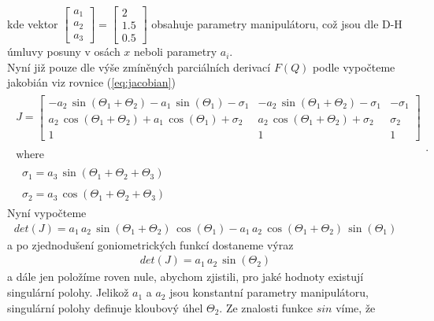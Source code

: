 \documentclass{article}
\begin{document}
			kde vektor \(\begin{bmatrix}a_{1}\\ a_{2}\\ a_{3}\end{bmatrix} = \begin{bmatrix}2\\ 1.5\\ 0.5\end{bmatrix}\) obsahuje parametry manipulátoru, což jsou dle D-H úmluvy posuny v osách \(x\) neboli parametry \(a_{i}\).\\
			Nyní již pouze dle výše zmíněných parciálních derivací \(F(Q)\) podle vypočteme jakobián viz rovnice (\eqref{eq:jacobian}) 
				\begin{align}
					\begin{array}{c}J=
					\begin{bmatrix}
						-a_2 \,\sin \left(\Theta_1 +\Theta_2 \right)-a_1 \,\sin \left(\Theta_1 \right)-\sigma_1  &-a_2 \,\sin \left(\Theta_1 +\Theta_2 \right)-\sigma_1  & -\sigma_1 \\
						a_2 \,\cos \left(\Theta_1 +\Theta_2 \right)+a_1 \,\cos \left(\Theta_1 \right)+\sigma_2  & a_2\,\cos \left(\Theta_1 +\Theta_2 \right)+\sigma_2  & \sigma_2 \\
						1 & 1 & 1
					\end{bmatrix}\\
					\mathrm{}\\
					\mathrm{where}\\
					\mathrm{}\\
					\;\;\sigma_1 =a_3 \,\sin \left(\Theta_1 +\Theta_2 +\Theta_3 \right)\\
					\mathrm{}\\
					\;\;\sigma_2 =a_3 \,\cos \left(\Theta_1 +\Theta_2 +\Theta_3 \right)
					\end{array}.
				\end{align}
			Nyní vypočteme 
				\begin{align}
					det(J)=a_1 \,a_2 \,\sin \left(\Theta_1 +\Theta_2 \right)\,\cos \left(\Theta_1 \right)-a_1 \,a_2\,\cos \left(\Theta_1 +\Theta_2 \right)\,\sin \left(\Theta_1 \right)
				\end{align}
			a po zjednodušení goniometrických funkcí dostaneme výraz 
				\begin{align}
					det(J)=a_1 \,a_2 \,\sin \left(\Theta_2 \right)
				\end{align}
			a dále jen položíme roven nule, abychom zjistili, pro jaké hodnoty existují singulární polohy. Jelikož \(a_{1}\) a \(a_{2}\) jsou konstantní parametry manipulátoru, singulární polohy definuje kloubový úhel \(\Theta_{2}\). Ze znalosti funkce \(sin\) víme, že 
\end{document}
